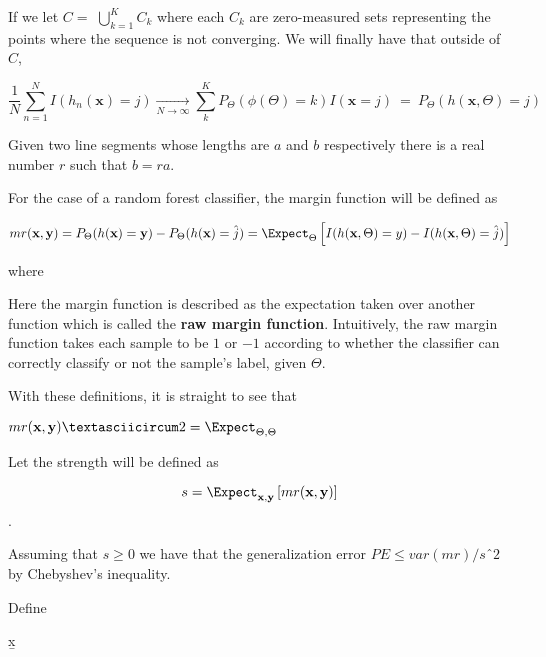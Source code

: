 If we let $C = $ $\bigcup\limits_{k=1}^{K} C_{k}$ where each $C_k$ are zero-measured sets representing the points where the sequence is not converging. We will finally have that  outside of $C$, 

$$ \frac{1}{N} \sum_{n=1}^N I(h_n(\textbf{x}) = j) \xrightarrow[N \to \infty]{} \sum_k^K    P_{\Theta}(\phi(\Theta)= k) I(\textbf{x} =j ) \ = \ P_{\Theta}(h(\textbf{x}, \Theta) = j)  $$ 



\begin{lemma}
Given two line segments whose lengths are $a$ and $b$ respectively there is a 
real number $r$ such that $b=ra$.
\end{lemma}

For the case of a random forest classifier, the margin function will be defined as

\begin{equation}\label{eq:rf-marginFunRf}
mr(\textbf{x},\textbf{y}) =  P_{\Theta}(h(\textbf{x}) = \textbf{y}) - P_{\Theta}(h(\textbf{x}) = \hat{j}) 
\\ 
= \Expect_{\Theta} \left[  I(h(\textbf{x},\Theta ) = y ) - I( h( \textbf{x},\Theta ) = \hat{j} )  \right]

\end{equation} 

where 

Here the margin function is described as the expectation taken over another function which is called the \textbf{raw margin function}\label{eq:rf-rawMarginFun}. Intuitively, the raw margin function takes each sample to be $1$ or $-1$ according to whether the classifier can correctly classify or not the sample's label, given $\Theta$.

With these definitions, it is straight to see that 

$mr( \textbf{x},\textbf{y} )ˆ2 = \Expect_{\Theta, \Theta}$

Let the strength will be defined as 

$$s =  \Expect_{\textbf{x},\textbf{y}} \left[ mr(\textbf{x},\textbf{y} ) \right] $$. \label{eq:rf-strength}

Assuming that $s \geq 0$ we have that the generalization error $PE \leq var(mr)/sˆ2$ by Chebyshev's inequality. 

Define 



\b{x}


